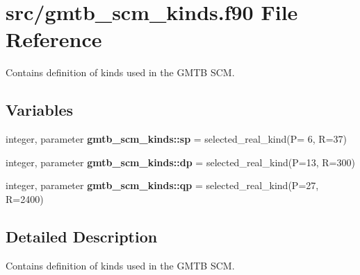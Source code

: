 \hypertarget{gmtb__scm__kinds_8f90}{}\section{src/gmtb\+\_\+scm\+\_\+kinds.f90 File Reference}
\label{gmtb__scm__kinds_8f90}


Contains definition of kinds used in the G\+M\+TB S\+CM.  


\subsection*{Variables}
\begin{DoxyCompactItemize}
\item 
integer, parameter {\bfseries gmtb\+\_\+scm\+\_\+kinds\+::sp} = selected\+\_\+real\+\_\+kind(P= 6, R=37)\hypertarget{gmtb__scm__kinds_8f90_a23cdd7c67d707b99fdeab5d2325636ba}{}\label{gmtb__scm__kinds_8f90_a23cdd7c67d707b99fdeab5d2325636ba}

\item 
integer, parameter {\bfseries gmtb\+\_\+scm\+\_\+kinds\+::dp} = selected\+\_\+real\+\_\+kind(P=13, R=300)\hypertarget{gmtb__scm__kinds_8f90_a805af17ae33d990854a8598ab0000eef}{}\label{gmtb__scm__kinds_8f90_a805af17ae33d990854a8598ab0000eef}

\item 
integer, parameter {\bfseries gmtb\+\_\+scm\+\_\+kinds\+::qp} = selected\+\_\+real\+\_\+kind(P=27, R=2400)\hypertarget{gmtb__scm__kinds_8f90_a73054345f8fb55e8d7ac2187728407a7}{}\label{gmtb__scm__kinds_8f90_a73054345f8fb55e8d7ac2187728407a7}

\end{DoxyCompactItemize}


\subsection{Detailed Description}
Contains definition of kinds used in the G\+M\+TB S\+CM. 


